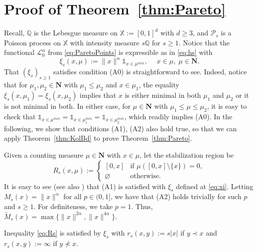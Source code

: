 \documentclass[11pt,reqno]{amsart}
\numberwithin{equation}{section}
\theoremstyle{definition}
\newcommand{\M}{\mu}
\newcommand{\sP}{\mathcal{P}}
\renewcommand{\emptyset}{\varnothing}
\newcommand{\XX}{\mathbb{X}}
\newcommand{\QQ}{\mathbb{Q}}
\newcommand{\Nb}{\mathbf{N}}
\renewcommand{\preceq}{\prec}
\begin{document}
\section{Proof of Theorem~\ref{thm:Pareto}}\label{sec:Pareto}
Recall, $\QQ$ is the Lebesgue
measure on $\XX:=[0,1]^d$ with $d \ge 3$, and $\sP_s$ is a Poisson
process on $\XX$ with intensity measure $s\QQ$ for $s \ge 1$. Notice that the
functional $\mathscr{L}_0^{\alpha}$ from \eqref{eq:ParetoPoints} is expressible as in
\eqref{eq:hs} with
\begin{equation}
\label{eq:xi}
\xi_s(x,\M):=\|x\|^\alpha \mathds{1}_{x \in \mu^{min}},\quad \; x\in\M, \; \M \in \Nb.  
\end{equation}
That $(\xi_s)_{s \ge 1}$ satisfies
condition (A0) is straightforward to see. Indeed, notice that for $\M_1, \M_2 \in \Nb$ with $\M_1 \le \M_2$ and $x \in \M_1$, the equality $\xi_s(x,\M_1)=\xi_s(x,\M_2)$ implies that $x$ is either minimal in both $\M_1$ and $\M_2$ or it is not minimal in both. In either case, for $\M \in \Nb$ with $\M_1 \le \M \le \M_2$, it is easy to check that $\mathds{1}_{x \in \mu^{min}}=\mathds{1}_{x \in \mu_1^{min}}=\mathds{1}_{x \in \mu_2^{min}}$, which readily implies (A0). In the following, we show that conditions
(A1), (A2) also hold true, so that we can apply Theorem~\ref{thm:KolBd} to prove Theorem~\ref{thm:Pareto}.

Given a counting measure $\M\in\Nb$ with $x \in \mu$, let the stabilization
region be
\begin{equation*}
R_s(x,\M):= 
\begin{cases}
[0,x] & \mbox{if $\M([0,x]\setminus \{x\})=0$},\\
\emptyset & \mbox{otherwise}.
\end{cases} 
\end{equation*}
It is easy to see (see also \cite[Section~3]{BM21})
that (A1) is satisfied with $\xi_s$ defined at \eqref{eq:xi}. Letting $M_{s}(x) = \|x\|^\alpha$ for all $p \in (0,1]$, we have that (A2) holds trivially for such $p$ and $s \ge 1$. For definiteness, we take $p=1$. Thus, $\widetilde{M}_{s}(x)=\max\{\|x\|^{2\alpha},\|x\|^{4\alpha}\}$.

Inequality \eqref{eq:Rs} is satisfied by $\xi_s$ with $r_{s}(x,y):=s|x|$
if $y\preceq x$ and $r_{s}(x,y):=\infty$ if $y \not \preceq x$. 
\end{document}
